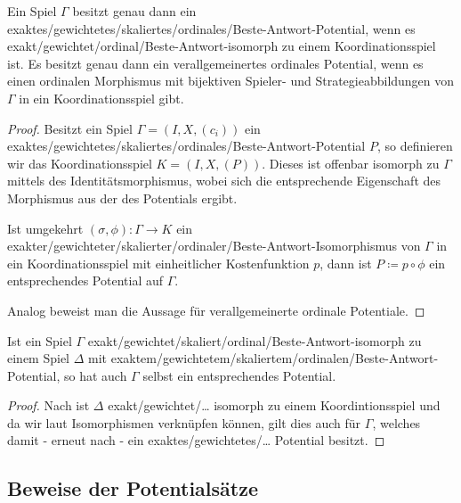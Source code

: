 \begin{prop}\label{prop:CharPotentialeDurchIsos}
	Ein Spiel $\Gamma$ besitzt genau dann ein exaktes/gewichtetes/skaliertes/ordinales/Beste-Antwort-Potential, wenn es exakt/gewichtet/ordinal/Beste-Antwort-isomorph zu einem Koordinationsspiel ist. Es besitzt genau dann ein verallgemeinertes ordinales Potential, wenn es einen ordinalen Morphismus mit bijektiven Spieler- und Strategieabbildungen von $\Gamma$ in ein Koordinationsspiel gibt.
\end{prop}

\begin{proof}
	Besitzt ein Spiel $\Gamma= (I, X, (c_i))$ ein exaktes/gewichtetes/skaliertes/ordinales/Beste-Antwort-Potential $P$, so definieren wir das Koordinationsspiel $K = (I, X, (P))$. Dieses ist offenbar isomorph zu $\Gamma$ mittels des Identitätsmorphismus, wobei sich die entsprechende Eigenschaft des Morphismus aus der des Potentials ergibt.
	
	Ist umgekehrt $(\sigma, \phi): \Gamma \to K$ ein exakter/gewichteter/skalierter/ordinaler/Beste-Antwort-Isomorphismus von $\Gamma$ in ein Koordinationsspiel mit einheitlicher Kostenfunktion $p$, dann ist $P \coloneqq p \circ \phi$ ein entsprechendes Potential auf $\Gamma$.
	
	Analog beweist man die Aussage für verallgemeinerte ordinale Potentiale.
\end{proof}

\begin{kor}\label{kor:PotentialeDurchIsosUebertragen}
	Ist ein Spiel $\Gamma$ exakt/gewichtet/skaliert/ordinal/Beste-Antwort-isomorph zu einem Spiel $\Delta$ mit exaktem/gewichtetem/skaliertem/ordinalen/Beste-Antwort-Potential, so hat auch $\Gamma$ selbst ein entsprechendes Potential.
\end{kor}

\begin{proof}
	Nach  ist $\Delta$ exakt/gewichtet/\dots{} isomorph zu einem Koordintionsspiel und da wir laut  Isomorphismen verknüpfen können, gilt dies auch für $\Gamma$, welches damit - erneut nach  - ein exaktes/gewichtetes/\dots{} Potential besitzt.
\end{proof}


\subsection{Beweise der Potentialsätze}\label{sec:Morphismen:Potentialsaetze}

